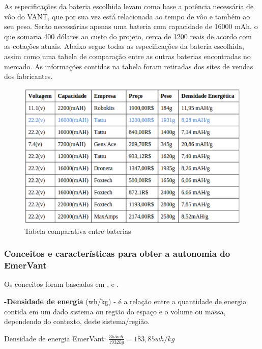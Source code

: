 As especificações da bateria escolhida levam como base a potência necessária de vôo do VANT, que por sua vez está relacionada ao tempo de vôo e também ao seu peso.  Serão necessárias apenas uma bateria com capacidade de 16000 mAh, o que somaria 400 dólares ao custo do projeto, cerca de 1200 reais de acordo com as cotações atuais. Abaixo segue todas as especificações da bateria escolhida, assim como uma tabela de comparação entre as outras baterias encontradas no mercado. 
As informações contidas na tabela foram retiradas dos sites de vendas dos fabricantes.
 \begin{figure}[h!]
    \centering
	\includegraphics[keepaspectratio=true,scale=0.7]{figuras/comparacaobaterias.eps}
    \caption{Tabela comparativa entre baterias}
\end{figure}

\nocite{bateria1}
\nocite{bateria2}
\nocite{bateria3}
\nocite{bateria4}
\nocite{bateria5}
\nocite{bateria6}
\nocite{bateria7}
\nocite{bateria8}
\nocite{bateria9}
\nocite{bateria10}


\subsubsection{Conceitos e características para obter a autonomia do EmerVant}

Os conceitos foram baseados em \cite{charlesa}, \cite{charlesb} e \cite{gibbs}.

\textbf{-Densidade de energia} (wh/kg) - é a relação entre a quantidade de energia contida em um dado sistema ou região do espaço e o volume ou massa, dependendo do contexto, deste sistema/região.

	Densidade de energia EmerVant: $\frac{355wh}{1932kg} =  183,85 wh/kg$

